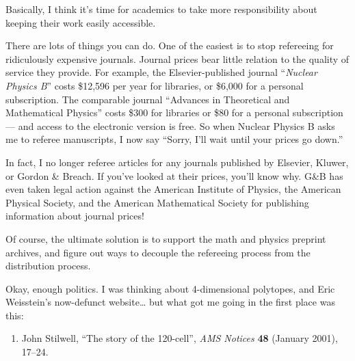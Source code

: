 \documentclass{article}
\def\tightlist{}
\renewcommand{\texttt}[1]{%
  \begingroup
  \ttfamily
  \begingroup\lccode`~=`/\lowercase{\endgroup\def~}{/\discretionary{}{}{}}%
  \begingroup\lccode`~=`[\lowercase{\endgroup\def~}{[\discretionary{}{}{}}%
  \begingroup\lccode`~=`.\lowercase{\endgroup\def~}{.\discretionary{}{}{}}%
  \catcode`/=\active\catcode`[=\active\catcode`.=\active
  \scantokens{#1\noexpand}%
  \endgroup
}
\begin{document}
Basically, I think it's time for academics to take more responsibility
about keeping their work easily accessible.

There are lots of things you can do. One of the easiest is to stop
refereeing for ridiculously expensive journals. Journal prices bear
little relation to the quality of service they provide. For example, the
Elsevier-published journal ``\emph{Nuclear Physics B}'' costs \$12,596
per year for libraries, or \$6,000 for a personal subscription. The
comparable journal ``Advances in Theoretical and Mathematical Physics''
costs \$300 for libraries or \$80 for a personal subscription --- and
access to the electronic version is free. So when Nuclear Physics B asks
me to referee manuscripts, I now say ``Sorry, I'll wait until your
prices go down.''

In fact, I no longer referee articles for any journals published by
Elsevier, Kluwer, or Gordon \& Breach. If you've looked at their prices,
you'll know why. G\&B has even taken legal action against the American
Institute of Physics, the American Physical Society, and the American
Mathematical Society for publishing information about journal prices!


Of course, the ultimate solution is to support the math and physics
preprint archives, and figure out ways to decouple the refereeing
process from the distribution process.

Okay, enough politics. I was thinking about 4-dimensional polytopes, and
Eric Weisstein's now-defunct website\ldots{} but what got me going in
the first place was this:

\begin{enumerate}
\def\labelenumi{\arabic{enumi})}
\setcounter{enumi}{4}
\tightlist
\item
  John Stilwell, ``The story of the 120-cell'', \emph{AMS Notices}
  \textbf{48} (January 2001), 17--24.
\end{enumerate}
\end{document}
